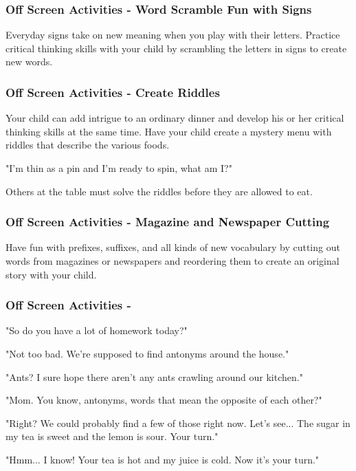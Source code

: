 \subsubsection{Off Screen Activities - Word Scramble Fun with Signs}

Everyday signs take on new meaning when you play with their letters.
Practice critical thinking skills with your child by scrambling the letters in signs to create new words.

\subsubsection{Off Screen Activities - Create Riddles}

Your child can add intrigue to an ordinary dinner and develop his or her critical thinking skills at the same time.
Have your child create a mystery menu with riddles that describe the various foods.

"I'm thin as a pin and I'm ready to spin, what am I?"

Others at the table must solve the riddles before they are allowed to eat.

\subsubsection{Off Screen Activities - Magazine and Newspaper Cutting}

Have fun with prefixes, suffixes, and all kinds of new vocabulary by cutting out words from magazines or newspapers and reordering them to create an original story with your child.

\subsubsection{Off Screen Activities - }

"So do you have a lot of homework today?"

"Not too bad.
We're supposed to find antonyms around the house."

"Ants? I sure hope there aren't any ants crawling around our kitchen."

"Mom.
You know, antonyms, words that mean the opposite of each other?"

"Right? We could probably find a few of those right now.
Let's see...
The sugar in my tea is sweet and the lemon is sour.
Your turn."

"Hmm...
I know!
Your tea is hot and my juice is cold.
Now it's your turn."

